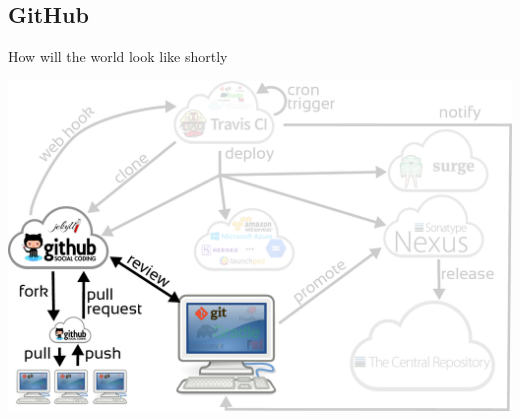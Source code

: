 \documentclass[presentation]{beamer}
\begin{document}
\subsection{GitHub}

\begin{frame}[fragile]{How will the world look like shortly}
	\begin{center}
		\includegraphics[width=.9\textwidth]{images/ci-fork}
	\end{center}
\end{frame}
\end{document}
